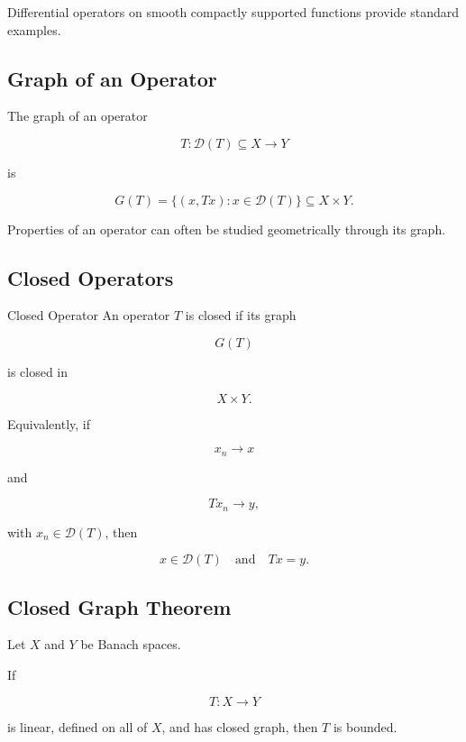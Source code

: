 Differential operators on smooth compactly supported functions provide
standard examples.

\subsection{Graph of an Operator}
\label{subsec:graph-operator}

The graph of an operator

\[
T:\mathcal{D}(T)\subseteq X\to Y
\]

is

\[
\boxed{
G(T)
=
\{
(x,Tx):
x\in\mathcal{D}(T)
\}
\subseteq
X\times Y.
}
\]

Properties of an operator can often be studied geometrically through its
graph.

\subsection{Closed Operators}
\label{subsec:closed-operators}

\begin{definitionbox}{Closed Operator}
An operator \(T\) is closed if its graph

\[
G(T)
\]

is closed in

\[
X\times Y.
\]
\end{definitionbox}

Equivalently, if

\[
x_n\to x
\]

and

\[
Tx_n\to y,
\]

with \(x_n\in\mathcal{D}(T)\), then

\[
\boxed{
x\in\mathcal{D}(T)
\quad\text{and}\quad
Tx=y.
}
\]

\subsection{Closed Graph Theorem}
\label{subsec:closed-graph-theorem-operator}

\begin{theorem}
Let \(X\) and \(Y\) be Banach spaces.

If

\[
T:X\to Y
\]

is linear, defined on all of \(X\), and has closed graph, then \(T\) is
bounded.
\end{theorem}


